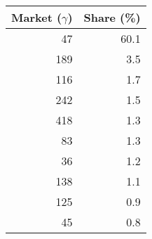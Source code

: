 \begin{tabular}{rr}
\toprule
 Market ($\gamma$) &  Share (\%) \\
\midrule
                47 &        60.1 \\
               189 &         3.5 \\
               116 &         1.7 \\
               242 &         1.5 \\
               418 &         1.3 \\
                83 &         1.3 \\
                36 &         1.2 \\
               138 &         1.1 \\
               125 &         0.9 \\
                45 &         0.8 \\
\bottomrule
\end{tabular}
